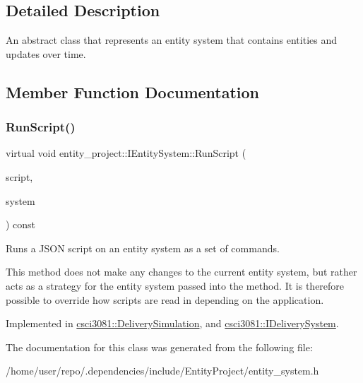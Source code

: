 \subsection{Detailed Description}
An abstract class that represents an entity system that contains entities and updates over time. 

\subsection{Member Function Documentation}
\mbox{\label{classentity__project_1_1IEntitySystem_a57a31878f9ae43f2ac3e70aa1903b8ec}} 
\subsubsection{\texorpdfstring{Run\+Script()}{RunScript()}}
{\footnotesize\ttfamily virtual void entity\+\_\+project\+::\+I\+Entity\+System\+::\+Run\+Script (\begin{DoxyParamCaption}\item[{const picojson\+::array \&}]{script,  }\item[{\hyperlink{classentity__project_1_1IEntitySystem}{I\+Entity\+System} $\ast$}]{system }\end{DoxyParamCaption}) const\hspace{0.3cm}{\ttfamily [pure virtual]}}



Runs a J\+S\+ON script on an entity system as a set of commands. 

This method does not make any changes to the current entity system, but rather acts as a strategy for the entity system passed into the method. It is therefore possible to override how scripts are read in depending on the application. 

Implemented in \hyperlink{classcsci3081_1_1DeliverySimulation_a332938cb4b972af169ad58dbc1b3bb05}{csci3081\+::\+Delivery\+Simulation}, and \hyperlink{classcsci3081_1_1IDeliverySystem_ae152276130e859b052f1d89417be6fc2}{csci3081\+::\+I\+Delivery\+System}.



The documentation for this class was generated from the following file\+:\begin{DoxyCompactItemize}
\item 
/home/user/repo/.\+dependencies/include/\+Entity\+Project/entity\+\_\+system.\+h\end{DoxyCompactItemize}
